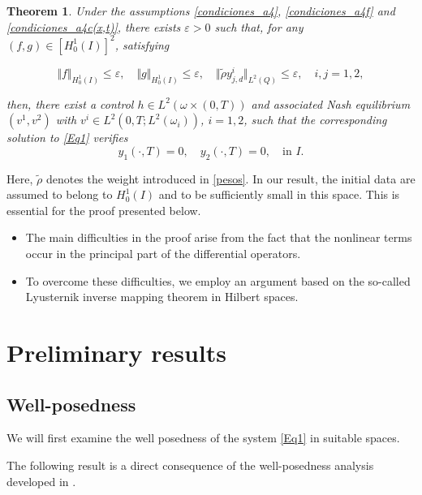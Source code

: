 \documentclass[11pt,a4paper]{amsart}
\numberwithin{equation}{section}
\newtheorem{theorem}{Theorem}[section]
\begin{document}
\begin{theorem}\label{teo:main_theorem_intro}
    Under the  assumptions \eqref{condiciones_a4}, \eqref{condiciones_a4f} and \eqref{condiciones_a4c(x,t)}, there exists $\varepsilon > 0$ such that, for any  $(f,g) \in [H_0^1(I)]^2$, satisfying 

    \begin{equation*}
        \Vert f \Vert_{H_0^1(I)}\leq \varepsilon,\quad \Vert g \Vert_{H_0^1(I)}\leq\varepsilon,\quad \Vert \tilde{\rho} y^{i}_{j,d} \Vert_{L^2(Q)}\leq\varepsilon,\quad i,j=1,2,
    \end{equation*}

    then, there exist a control $h \in L^2(\omega\times (0,T))$ and associated Nash equilibrium $(v^1,v^2)$ with $v^i \in L^2(0,T; L^2(\omega_i))$, $i=1, 2$, such that the corresponding solution to \eqref{Eq1} verifies
     \begin{equation*}
     	y_1(\cdot,T)=0,\quad y_2(\cdot,T)=0, \quad\text{in  }I.
     \end{equation*}
\end{theorem}\textbf{}
Here, $\tilde\rho$ denotes the weight introduced in \eqref{pesos}.
In our result, the initial data are assumed to belong to $H_0^1(I)$ and to be sufficiently small in this space. This is essential for the proof presented below.
\begin{itemize}
\item The main difficulties in the proof arise from the fact that the nonlinear terms occur in the principal part of the differential operators.
\item To overcome these difficulties, we employ an argument based on the so-called Lyusternik inverse mapping theorem in Hilbert spaces.
\end{itemize}

\section{Preliminary results}

\subsection{\bf Well-posedness }

 We will first examine the well
posedness of the  system \eqref{Eq1} in suitable spaces.

The following result is a direct consequence of the well-posedness analysis developed in \cite{rincon2006nonlinear}.
\end{document}
